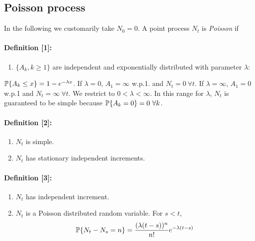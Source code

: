 \documentclass[all-lectures.tex]{subfiles}
\begin{document}
\subsection{Poisson process}
In the following we customarily take $N_0 = 0$. A point process $N_t$ is \textit{Poisson} if 
\paragraph{Definition [1]:}{
\begin{enumerate}
\item $\{A_k, k \geq 1\}$ are independent and exponentially distributed with parameter $\lambda$:
\end{enumerate}
$\P\{A_k \leq x\} = 1 - e^{-\lambda x}$. If $\lambda = 0$, $A_1 = \infty$ w.p.1. and $N_t = 0 \ \forall t$. If $\lambda = \infty$, $A_1 = 0$ w.p.1 and $N_t = \infty \ \forall t$. We restrict to $0<\lambda<\infty$. In this range for $\lambda$, $N_t$ is guaranteed to be simple because $\P\{A_k = 0\} = 0 \ \forall k$.
}
\paragraph{Definition [2]:}{
\begin{enumerate}
\item $N_t$ is simple.
\item $N_t$ has stationary independent increments.
\end{enumerate}
}
\paragraph{Definition [3]:}{
\begin{enumerate}
\item $N_t$ has independent increment.
\item $N_t$ is a Poisson distributed random variable. For $s < t$, 
	\begin{align*}
	\P\{N_t - N_s = n\} = \frac{(\lambda (t-s))^n}{n!} e^{-\lambda (t-s)}
	\end{align*}
\end{enumerate}
}
\end{document}
